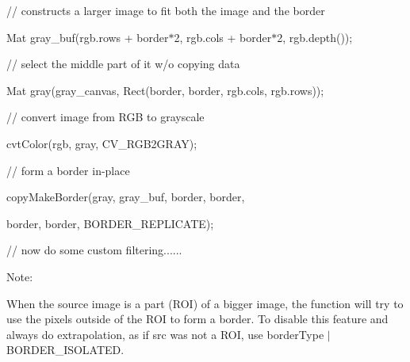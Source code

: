 {\ttfamily }

{\ttfamily }

{\ttfamily // constructs a larger image to fit both the image and the border}

{\ttfamily }

{\ttfamily }

{\ttfamily Mat gray\+\_\+buf(rgb.\+rows + border$\ast$2, rgb.\+cols + border$\ast$2, rgb.\+depth());}

{\ttfamily }

{\ttfamily }

{\ttfamily // select the middle part of it w/o copying data}

{\ttfamily }

{\ttfamily }

{\ttfamily Mat gray(gray\+\_\+canvas, Rect(border, border, rgb.\+cols, rgb.\+rows));}

{\ttfamily }

{\ttfamily }

{\ttfamily // convert image from R\+GB to grayscale}

{\ttfamily }

{\ttfamily }

{\ttfamily cvt\+Color(rgb, gray, C\+V\+\_\+\+R\+G\+B2\+G\+R\+A\+Y);}

{\ttfamily }

{\ttfamily }

{\ttfamily // form a border in-\/place}

{\ttfamily }

{\ttfamily }

{\ttfamily copy\+Make\+Border(gray, gray\+\_\+buf, border, border,}

{\ttfamily }

{\ttfamily }

{\ttfamily border, border, B\+O\+R\+D\+E\+R\+\_\+\+R\+E\+P\+L\+I\+C\+A\+TE);}

{\ttfamily }

{\ttfamily }

{\ttfamily // now do some custom filtering......}

{\ttfamily }

{\ttfamily }

{\ttfamily Note\+: }

When the source image is a part (R\+OI) of a bigger image, the function will try to use the pixels outside of the R\+OI to form a border. To disable this feature and always do extrapolation, as if {\ttfamily src} was not a R\+OI, use {\ttfamily border\+Type $\vert$ B\+O\+R\+D\+E\+R\+\_\+\+I\+S\+O\+L\+A\+T\+ED}.


